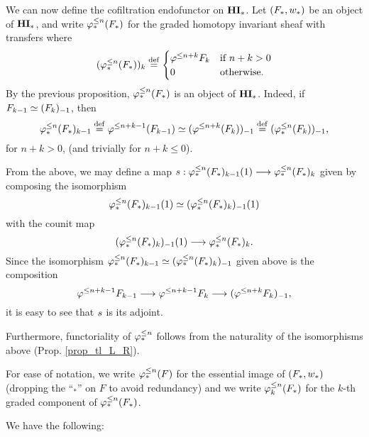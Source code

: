 We can now define the cofiltration endofunctor on $\HM$. Let
$(F_*, \deloop_*)$ be an object of $\HM$, and write $\tlHM{n}(F_*)$ 
for the graded homotopy invariant sheaf with transfers where
\[
(\tlHM{n}(F_*))_k \defeq
\begin{cases}
   \tlHI{n + k}F_k & \textrm{if } n + k > 0 \\
   0               & \textrm{otherwise}.
\end{cases}
\]
By the previous proposition, $\tlHM{n}(F_*)$ is an object of 
$\HM$. Indeed, if $F_{k - 1} \simeq \RHI{(F_{k})}$, then
\[
\tlHM{n}(F_*)_{k - 1} \defeq \tlHI{n + k - 1}(F_{k - 1}) \simeq 
   \RHI{(\tlHI{n + k}(F_{k}))} \defeq
   \RHI{(\tlHM{n}(F_{k}))},
\]
for $n + k > 0$, (and trivially for $n + k \leq 0$).

From the above, we may define a map $\susp: 
\LHI{\tlHM{n}(F_*)_{k - 1}} \to \tlHM{n}(F_*)_{k}$ given by 
composing the isomorphism
\[
\LHI{\tlHM{n}(F_*)_{k - 1}} \simeq \LHI{\RHI{(\tlHM{n}(F_*)_{k})}}
\]
with the counit map
\[
\LHI{\RHI{(\tlHM{n}(F_*)_{k})}}\to \tlHM{n}(F_*)_{k}.
\]
Since the isomorphism $\tlHM{n}(F_*)_{k - 1} \simeq 
\RHI{(\tlHM{n}(F_*)_k)}$ given above is the composition
\[
\tlHI{n + k - 1}F_{k - 1} \to \tlHI{n + k - 1}F_k
   \to \RHI{(\tlHI{n + k} F_k)},
\]
it is easy to see that $\susp$ is its adjoint.

Furthermore, functoriality of $\tlHM{n}$ follows from the 
naturality of the isomorphisms above (Prop. \ref{prop_tl_L_R}).

For ease of notation, we write $\tlHM{n}(F)$ for the essential 
image of $(F_*, \deloop_*)$ (dropping the ``$_*$'' on $F$ to avoid 
redundancy) and we write $\tlHM[k]{n}(F_*)$ for the $k$-th graded 
component of $\tlHM{n}(F_*)$.

We have the following:
